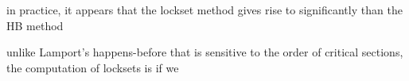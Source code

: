 \documentclass[landscape, a4paper]{article}
\begin{document}
\begin{minipage}[t]{0.19\linewidth}
\begin{betterlist}
\begin{betterlist}
		\end{betterlist}
		\item {}
		\begin{betterlist}
			\item in practice, it appears that the lockset method gives rise to significantly  than the HB method
			\item unlike Lamport’s happens-before that is sensitive to the order of critical sections, the computation of locksets is  if we 
		\end{betterlist}
	\end{betterlist}
\end{minipage}
\end{document}
